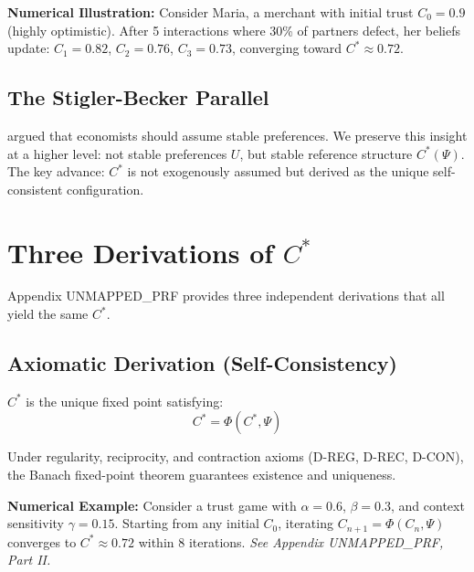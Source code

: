 \textbf{Numerical Illustration:} Consider Maria, a merchant with initial trust $C_0 = 0.9$
(highly optimistic). After 5 interactions where 30\% of partners defect, her beliefs
update: $C_1 = 0.82$, $C_2 = 0.76$, $C_3 = 0.73$, converging toward $C^* \approx 0.72$.

\subsection{The Stigler-Becker Parallel}
\label{sec:ch6-stigler-becker}

\citet{stiglerbecker1977} argued that economists should assume stable preferences.
We preserve this insight at a higher level: not stable preferences $U$, but stable
reference structure $C^*(\Psi)$. The key advance: $C^*$ is not exogenously assumed
but derived as the unique self-consistent configuration.



\section{Three Derivations of $C^*$}
\label{sec:cstar-derivations}

Appendix UNMAPPED_PRF provides three independent derivations that all yield the same $C^*$.

\subsection{Axiomatic Derivation (Self-Consistency)}
\label{sec:ch6-axiomatic}

$C^*$ is the unique fixed point satisfying:
\begin{equation}
\label{eq:cstar-fixedpoint}
C^* = \Phi(C^*, \Psi)
\end{equation}

Under regularity, reciprocity, and contraction axioms (D-REG, D-REC, D-CON),
the Banach fixed-point theorem guarantees existence and uniqueness.

\textbf{Numerical Example:} Consider a trust game with $\alpha = 0.6$, $\beta = 0.3$,
and context sensitivity $\gamma = 0.15$. Starting from any initial $C_0$, iterating
$C_{n+1} = \Phi(C_n, \Psi)$ converges to $C^* \approx 0.72$ within 8 iterations.
\emph{See Appendix UNMAPPED_PRF, Part II.}

